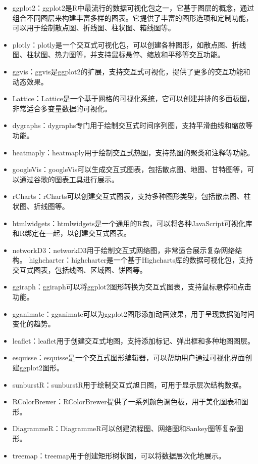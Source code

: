 \documentclass[]{book}
\begin{document}
\begin{itemize}
\item
  ggplot2：ggplot2是R中最流行的数据可视化包之一，它基于图层的概念，通过组合不同图层来构建丰富多样的图表。它提供了丰富的图形选项和定制功能，可以用于绘制散点图、折线图、柱状图、箱线图等。
\item
  plotly：plotly是一个交互式可视化包，可以创建各种图形，如散点图、折线图、柱状图、热力图等，并支持鼠标悬停、缩放和平移等交互功能。
\item
  ggvis：ggvis是ggplot2的扩展，支持交互式可视化，提供了更多的交互功能和动态效果。
\item
  Lattice：Lattice是一个基于网格的可视化系统，它可以创建并排的多面板图，非常适合多变量数据的可视化。
\item
  dygraphs：dygraphs专门用于绘制交互式时间序列图，支持平滑曲线和缩放等功能。
\item
  heatmaply：heatmaply用于绘制交互式热图，支持热图的聚类和注释等功能。
\item
  googleVis：googleVis可以生成交互式图表，包括散点图、地图、甘特图等，可以通过谷歌的图表工具进行展示。
\item
  rCharts：rCharts可以创建交互式图表，支持多种图形类型，包括散点图、柱状图、折线图等。
\item
  htmlwidgets：htmlwidgets是一个通用的R包，可以将各种JavaScript可视化库和R绑定在一起，以创建交互式图表。
\item
  networkD3：networkD3用于绘制交互式网络图，非常适合展示复杂网络结构。
  highcharter：highcharter是一个基于Highcharts库的数据可视化包，支持交互式图表，包括线图、区域图、饼图等。
\item
  ggiraph：ggiraph可以将ggplot2图形转换为交互式图表，支持鼠标悬停和点击功能。
\item
  gganimate：gganimate可以为ggplot2图形添加动画效果，用于呈现数据随时间变化的趋势。
\item
  leaflet：leaflet用于创建交互式地图，支持添加标记、弹出框和多种地图图层。
\item
  esquisse：esquisse是一个交互式图形编辑器，可以帮助用户通过可视化界面创建ggplot2图形。
\item
  sunburstR：sunburstR用于绘制交互式旭日图，可用于显示层次结构数据。
\item
  RColorBrewer：RColorBrewer提供了一系列颜色调色板，用于美化图表和图形。
\item
  DiagrammeR：DiagrammeR可以创建流程图、网络图和Sankey图等复杂图形。
\item
  treemap：treemap用于创建矩形树状图，可以将数据层次化地展示。

\end{itemize}
\end{document}
